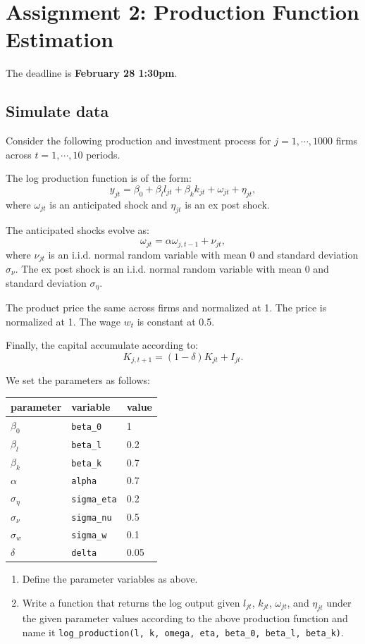 \documentclass[]{book}
\begin{document}
\chapter{Assignment 2: Production Function
Estimation}\label{assignment2}

The deadline is \textbf{February 28 1:30pm}.

\section{Simulate data}\label{simulate-data-1}

Consider the following production and investment process for
\(j = 1, \cdots, 1000\) firms across \(t = 1, \cdots, 10\) periods.

The log production function is of the form: \[
y_{jt} = \beta_0 + \beta_l l_{jt} + \beta_k k_{jt} + \omega_{jt} + \eta_{jt},
\] where \(\omega_{jt}\) is an anticipated shock and \(\eta_{jt}\) is an
ex post shock.

The anticipated shocks evolve as: \[
\omega_{jt} = \alpha \omega_{j, t - 1} + \nu_{jt},
\] where \(\nu_{jt}\) is an i.i.d. normal random variable with mean 0
and standard deviation \(\sigma_\nu\). The ex post shock is an i.i.d.
normal random variable with mean 0 and standard deviation
\(\sigma_{\eta}\).

The product price the same across firms and normalized at 1. The price
is normalized at 1. The wage \(w_t\) is constant at 0.5.

Finally, the capital accumulate according to: \[
K_{j, t + 1} = (1 - \delta) K_{jt} + I_{jt}.
\]

We set the parameters as follows:

\begin{longtable}[]{@{}lll@{}}
\toprule
parameter & variable & value\tabularnewline
\midrule
\endhead
\(\beta_0\) & \texttt{beta\_0} & 1\tabularnewline
\(\beta_l\) & \texttt{beta\_l} & 0.2\tabularnewline
\(\beta_k\) & \texttt{beta\_k} & 0.7\tabularnewline
\(\alpha\) & \texttt{alpha} & 0.7\tabularnewline
\(\sigma_{\eta}\) & \texttt{sigma\_eta} & 0.2\tabularnewline
\(\sigma_{\nu}\) & \texttt{sigma\_nu} & 0.5\tabularnewline
\(\sigma_{w}\) & \texttt{sigma\_w} & 0.1\tabularnewline
\(\delta\) & \texttt{delta} & 0.05\tabularnewline
\bottomrule
\end{longtable}

\begin{enumerate}
\def\labelenumi{\arabic{enumi}.}
\item
  Define the parameter variables as above.
\item
  Write a function that returns the log output given \(l_{jt}\),
  \(k_{jt}\), \(\omega_{jt}\), and \(\eta_{jt}\) under the given
  parameter values according to the above production function and name
  it
  \texttt{log\_production(l,\ k,\ omega,\ eta,\ beta\_0,\ beta\_l,\ beta\_k)}.
\end{enumerate}
\end{document}
